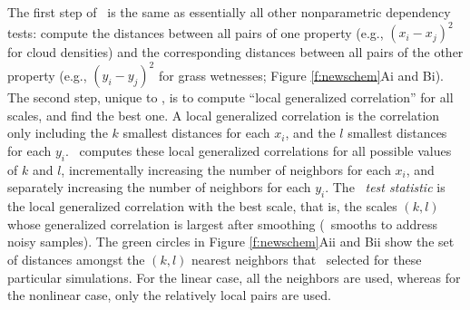 \documentclass[11pt]{article}
\begin{document}
The first step of \Mgc~is the same as essentially all other nonparametric dependency tests:
compute the distances between all pairs of one property (e.g., $(x_i-x_j)^2$ for cloud densities) and the corresponding distances between all pairs of the other property (e.g., $(y_i - y_j)^2$ for grass wetnesses; Figure \ref{f:newschem}{\color{magenta}Ai} and {\color{magenta}Bi}). 
The second step, unique to \Mgc, is to compute ``local generalized correlation'' for all scales, and find the best one.
A local generalized correlation is the correlation only including the $k$ smallest distances for each $x_i$, and the $l$ smallest distances for each  $y_i$.  \Mgc~computes these local generalized correlations for all possible values of $k$ and $l$, incrementally increasing the number of neighbors for each $x_i$, and separately increasing the number of neighbors for each $y_i$.
The \Mgc~\emph{test statistic} is the local generalized correlation with the best scale, that is, the scales $(k,l)$  whose generalized correlation is largest after smoothing (\Mgc~smooths to address noisy samples). 
The green circles in Figure \ref{f:newschem}{\color{magenta}Aii} and {\color{magenta}Bii} show the set of distances amongst the $(k,l)$ nearest neighbors that \Mgc~selected for these particular simulations.
For the linear case, all the neighbors are used, whereas for the nonlinear case, only the relatively local pairs are used.  

\end{document}
